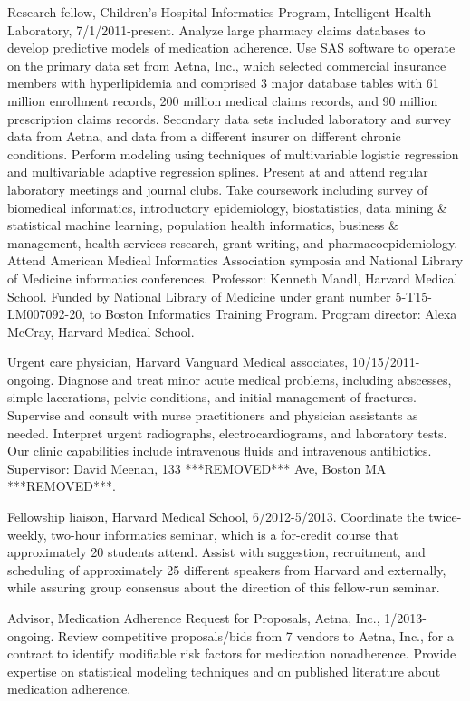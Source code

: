 \documentclass[11pt]{article}
\begin{document}
Research fellow, Children’s Hospital Informatics Program, Intelligent
Health Laboratory, 7/1/2011-present. Analyze large pharmacy claims
databases to develop predictive models of medication adherence. Use
SAS software to operate on the primary data set from Aetna, Inc.,
which selected commercial insurance members with hyperlipidemia and
comprised 3 major database tables with 61 million enrollment records,
200 million medical claims records, and 90 million prescription claims
records. Secondary data sets included laboratory and survey data from
Aetna, and data from a different insurer on different chronic
conditions. Perform modeling using techniques of multivariable
logistic regression and multivariable adaptive regression splines.
Present at and attend regular laboratory meetings and journal clubs.
Take coursework including survey of biomedical informatics,
introductory epidemiology, biostatistics, data mining \& statistical
machine learning, population health informatics, business \&
management, health services research, grant writing, and
pharmacoepidemiology. Attend American Medical Informatics Association
symposia and National Library of Medicine informatics conferences.
Professor: Kenneth Mandl, Harvard Medical School. Funded by National
Library of Medicine under grant number 5-T15-LM007092-20, to Boston
Informatics Training Program. Program director: Alexa McCray, Harvard
Medical School.

Urgent care physician, Harvard Vanguard Medical associates,
10/15/2011-ongoing. Diagnose and treat minor acute medical problems,
including abscesses, simple lacerations, pelvic conditions, and
initial management of fractures. Supervise and consult with nurse
practitioners and physician assistants as needed. Interpret urgent
radiographs, electrocardiograms, and laboratory tests. Our clinic
capabilities include intravenous fluids and intravenous antibiotics.
Supervisor: David Meenan, 133 ***REMOVED*** Ave, Boston MA ***REMOVED***.

Fellowship liaison, Harvard Medical School, 6/2012-5/2013. Coordinate
the twice-weekly, two-hour informatics seminar, which is a for-credit
course that approximately 20 students attend. Assist with suggestion,
recruitment, and scheduling of approximately 25 different speakers
from Harvard and externally, while assuring group consensus about the
direction of this fellow-run seminar.

Advisor, Medication Adherence Request for Proposals, Aetna, Inc.,
1/2013-ongoing. Review competitive proposals/bids from 7 vendors to
Aetna, Inc., for a contract to identify modifiable risk factors for
medication nonadherence. Provide expertise on statistical modeling
techniques and on published literature about medication adherence.
\end{document}
